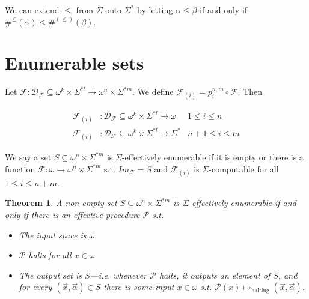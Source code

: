 \documentclass[a4paper, 12pt]{article}
\newtheorem{theorem}{Theorem}
\newtheorem{theorem}{Theorem}
\begin{document}
We can extend $\leq$ from $\Sigma$ onto $\Sigma^{*}$ by letting $\alpha \leq
\beta $ if and only if $\#^{\leq}(\alpha) \leq \#^{(\leq)}(\beta )$.

\pagebreak


\section{Enumerable sets}

Let $\mathcal{F} : \mathcal{D}_{\mathcal{F}} \subseteq \omega^{k} \times \Sigma^{*l} \to \omega^n
\times \Sigma^{*m}$. We define $\mathcal{F}_{(i)} = p_i^{n, m} \circ
\mathcal{F}$. Then

\begin{align*}
    \mathcal{F}_{(i)} &: \mathcal{D}_{\mathcal{F}} \subseteq \omega^{k} \times
    \Sigma^{*l}  \mapsto \omega & 1 \leq i \leq n\\
    \mathcal{F}_{(i)} &: \mathcal{D}_{\mathcal{F}} \subseteq \omega^{k} \times
    \Sigma^{*l} \mapsto  \Sigma^{*} & n + 1 \leq i \leq m
\end{align*}

We say a set $S \subseteq \omega^n \times \Sigma^{*m} $ is $\Sigma$-effectively
enumerable  if it is empty or there is a function $\mathcal{F} : \omega \to
\omega^n \times \Sigma^{*m}$ s.t. $Im_{\mathcal{F}} = S$ and $\mathcal{F}_{(i)}$
is $\Sigma$-computable for all $1 \leq i \leq n + m$.

\begin{theorem}
    A non-empty set $S \subseteq \omega^n \times \Sigma^{*m}$ is
    $\Sigma$-effectively enumerable if and only if there is an effective
    procedure $\mathcal{P}$ s.t. 

    \begin{itemize}
        \item The input space is $\omega$
        \item $\mathcal{P}$ halts for all $x \in \omega$ 
        \item The output set is $S$---i.e. whenever $\mathcal{P}$ halts, it
            outputs an element of $S$, and for every $(\overrightarrow{x},
            \overrightarrow{\alpha}) \in S$ there is some input $x \in \omega$
        s.t. $\mathcal{P}(x) \mapsto_{\text{halting}} (\overrightarrow{x},
        \overrightarrow{\alpha})$.
    \end{itemize}
\end{theorem}
\end{document}

